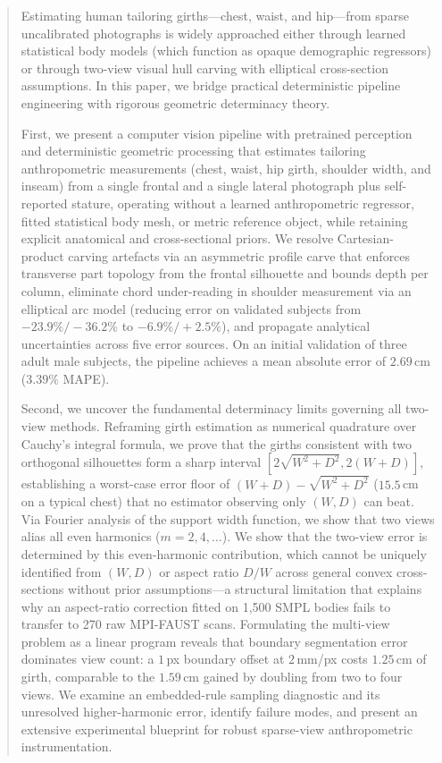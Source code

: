 \documentclass[journal]{IEEEtran}
\begin{document}
\begin{abstract}
Estimating human tailoring girths---chest, waist, and hip---from sparse uncalibrated photographs is widely approached either through learned statistical body models (which function as opaque demographic regressors) or through two-view visual hull carving with elliptical cross-section assumptions. In this paper, we bridge practical deterministic pipeline engineering with rigorous geometric determinacy theory. 

First, we present a computer vision pipeline with pretrained perception and deterministic geometric processing that estimates tailoring anthropometric measurements (chest, waist, hip girth, shoulder width, and inseam) from a single frontal and a single lateral photograph plus self-reported stature, operating without a learned anthropometric regressor, fitted statistical body mesh, or metric reference object, while retaining explicit anatomical and cross-sectional priors. We resolve Cartesian-product carving artefacts via an asymmetric profile carve that enforces transverse part topology from the frontal silhouette and bounds depth per column, eliminate chord under-reading in shoulder measurement via an elliptical arc model (reducing error on validated subjects from $-23.9\%/-36.2\%$ to $-6.9\%/+2.5\%$), and propagate analytical uncertainties across five error sources. On an initial validation of three adult male subjects, the pipeline achieves a mean absolute error of $2.69$\,cm ($3.39\%$ MAPE).

Second, we uncover the fundamental determinacy limits governing all two-view methods. Reframing girth estimation as numerical quadrature over Cauchy's integral formula, we prove that the girths consistent with two orthogonal silhouettes form a sharp interval $[2\sqrt{W^2+D^2}, 2(W+D)]$, establishing a worst-case error floor of $(W+D)-\sqrt{W^2+D^2}$ ($15.5$\,cm on a typical chest) that no estimator observing only $(W, D)$ can beat. Via Fourier analysis of the support width function, we show that two views alias all even harmonics ($m=2,4,\dots$). We show that the two-view error is determined by this even-harmonic contribution, which cannot be uniquely identified from $(W, D)$ or aspect ratio $D/W$ across general convex cross-sections without prior assumptions---a structural limitation that explains why an aspect-ratio correction fitted on 1,500 SMPL bodies fails to transfer to 270 raw MPI-FAUST scans. Formulating the multi-view problem as a linear program reveals that boundary segmentation error dominates view count: a $1$\,px boundary offset at $2$\,mm/px costs $1.25$\,cm of girth, comparable to the $1.59$\,cm gained by doubling from two to four views. We examine an embedded-rule sampling diagnostic and its unresolved higher-harmonic error, identify failure modes, and present an extensive experimental blueprint for robust sparse-view anthropometric instrumentation.
\end{abstract}
\end{document}
